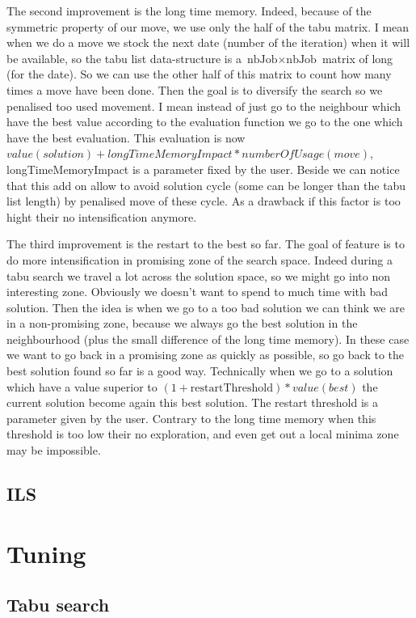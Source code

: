 \documentclass[12pt,a4paper]{article}
\begin{document}
The second improvement is the long time memory. Indeed, because of the symmetric property of our move, we use only the half of the tabu matrix. I mean when we do a move we stock the next date (number of the iteration) when it will be available, so the tabu list data-structure is a $\text{nbJob} \times \text{nbJob}$ matrix of long (for the date). So we can use the other half of this matrix to count how many times a move have been done. Then the goal is to diversify the search so we penalised too used movement. I mean instead of just go to the neighbour which have the best value according to the evaluation function we go to the one which have the best evaluation. This evaluation is now $value(solution) + longTimeMemoryImpact*numberOfUsage(move)$, longTimeMemoryImpact is a parameter fixed by the user. Beside we can notice that this add on allow to avoid solution cycle (some can be longer than the tabu list length) by penalised move of these cycle. As a drawback if this factor is too hight their no intensification anymore.

The third improvement is the restart to the best so far. The goal of feature is to do more intensification in promising zone of the search space. Indeed during a tabu search we travel a lot across the solution space, so we might go into non interesting zone. Obviously we doesn't want to spend to much time with bad solution. Then the idea is when we go to a too bad solution we can think we are in a non-promising zone, because we always go the best solution in the neighbourhood (plus the small difference of the long time memory). In these case we want to go back in a promising zone as quickly as possible, so go back to the best solution found so far is a good way. Technically when we go to a solution which have a value superior to $(1 + \text{restartThreshold}) * value(best)$ the current solution become again this best solution. The restart threshold is a parameter given by the user. Contrary to the long time memory when this threshold is too low their no exploration, and even get out a local minima zone may be impossible.

\subsection{ILS}

\section{Tuning}

\subsection{Tabu search }
\end{document}
